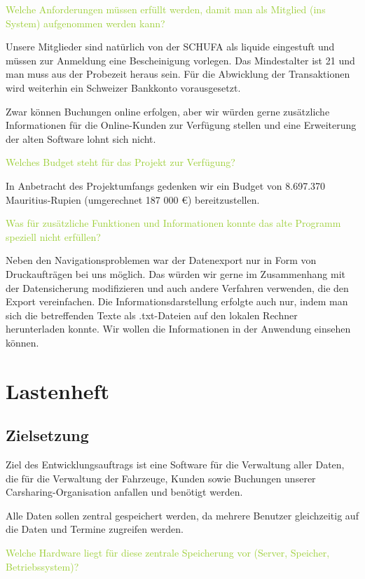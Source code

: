 \textcolor{YellowGreen}{Welche Anforderungen müssen erfüllt werden, damit man als Mitglied (ins System) aufgenommen werden kann?}

\textcolor{NavyBlue}{Unsere Mitglieder sind natürlich von der SCHUFA als liquide eingestuft und müssen zur Anmeldung eine Bescheinigung vorlegen. Das Mindestalter ist 21 und man muss aus der Probezeit heraus sein. Für die Abwicklung der Transaktionen wird weiterhin ein Schweizer Bankkonto vorausgesetzt.}

Zwar können Buchungen online erfolgen, aber wir würden gerne zusätzliche Informationen für die Online-Kunden zur Verfügung stellen und eine Erweiterung der alten Software lohnt sich nicht.

\textcolor{YellowGreen}{Welches Budget steht für das Projekt zur Verfügung?}

\textcolor{NavyBlue}{In Anbetracht des Projektumfangs gedenken wir ein Budget von 8.697.370 Mauritius-Rupien (umgerechnet 187 000 €) bereitzustellen.}

\textcolor{YellowGreen}{Was für zusätzliche Funktionen und Informationen konnte das alte Programm speziell nicht erfüllen?}

\textcolor{NavyBlue}{Neben den Navigationsproblemen war der Datenexport nur in Form von Druckaufträgen bei uns möglich. Das würden wir gerne im Zusammenhang mit der Datensicherung modifizieren und auch andere Verfahren verwenden, die den Export vereinfachen. Die Informationsdarstellung erfolgte auch nur, indem man sich die betreffenden Texte als .txt-Dateien auf den lokalen Rechner herunterladen konnte. Wir wollen die Informationen in der Anwendung einsehen können.}

\section{Lastenheft}

\subsection{Zielsetzung}

Ziel des Entwicklungsauftrags ist eine Software für die Verwaltung aller Daten, die für die Verwaltung der Fahrzeuge, Kunden sowie Buchungen unserer Carsharing-Organisation anfallen und benötigt werden. 

Alle Daten sollen zentral gespeichert werden, da mehrere Benutzer gleichzeitig auf die Daten und Termine zugreifen werden. 

\textcolor{YellowGreen}{Welche Hardware liegt für diese zentrale Speicherung vor (Server, Speicher, Betriebssystem)?}

